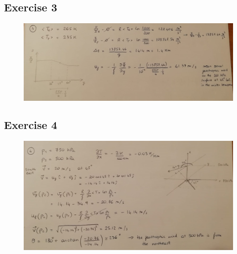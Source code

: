\documentclass[11pt,a4paper]{article}
\begin{document}
\subsection{Exercise 3}
\begin{figure}[H]
	\centering \includegraphics[width=150mm]{images/es3.JPEG}
\end{figure}
\subsection{Exercise 4}
\begin{figure}[H]
	\centering \includegraphics[width=150mm]{images/es4.JPEG}
\end{figure}
\end{document}
